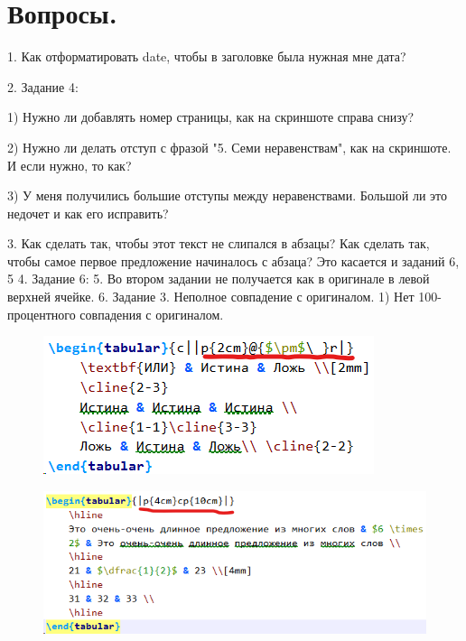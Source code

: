 \documentclass[a4paper,12pt]{article} %
\begin{document}
	\newpage
	\section{Вопросы.}
	1. Как отформатировать date, чтобы в заголовке была нужная мне дата?
	
	2. Задание 4:

		1) Нужно ли добавлять номер страницы, как на скриншоте справа снизу?
		
		2) Нужно ли делать отступ с фразой "5. Семи неравенствам", как на скриншоте. И если нужно, то как?
		
		3) У меня получились большие отступы между неравенствами. Большой ли это недочет и как его исправить?
		
	3. Как сделать так, чтобы этот текст не слипался в абзацы? Как сделать так, чтобы самое первое предложение начиналось с абзаца? Это касается и заданий 6, 5
	4. Задание 6:
	5. Во втором задании не получается как в оригинале в левой верхней ячейке.
	6. Задание 3. Неполное совпадение с оригиналом.
		1) Нет 100-процентного совпадения с оригиналом.
		\begin{figure}
			\centering
			\includegraphics[width=0.7\linewidth]{screenshot001}
			\caption{}
			\label{fig:screenshot001}
		\end{figure}
		\begin{figure}
			\centering
			\includegraphics[width=0.7\linewidth]{screenshot002}
			\caption{}
			\label{fig:screenshot002}
		\end{figure}
		
	
\end{document}
